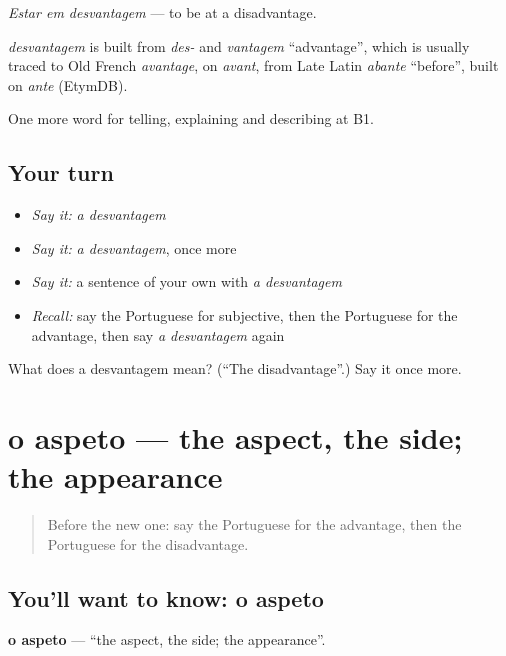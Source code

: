 \emph{Estar em desvantagem} — to be at a disadvantage.

\begin{cousinweb}
\emph{desvantagem} is built from \emph{des-} and \emph{vantagem} \textquotedblleft{}advantage\textquotedblright{}, which is usually traced to Old French \emph{avantage}, on \emph{avant}, from Late Latin \emph{abante} \textquotedblleft{}before\textquotedblright{}, built on \emph{ante} (EtymDB).
\end{cousinweb}

\begin{grammarlens}[title={What you've built}]
One more word for telling, explaining and describing at B1.
\end{grammarlens}

\subsection*{Your turn}
\begin{itemize}
\raggedright
  \item \emph{Say it:} \emph{a desvantagem}
  \item \emph{Say it:} \emph{a desvantagem}, once more
  \item \emph{Say it:} a sentence of your own with \emph{a desvantagem}
  \item \emph{Recall:} say the Portuguese for subjective, then the Portuguese for the advantage, then say \emph{a desvantagem} again
\end{itemize}

\begin{tcolorbox}[breakable,colback=teal!4,colframe=teal!35!black,title={Before you move on}]
What does a desvantagem mean? (\textquotedblleft{}The disadvantage\textquotedblright{}.) Say it once more.
\end{tcolorbox}
\section[o aspeto]{o aspeto — the aspect, the side; the appearance}

\label{lesson:PT-C345-aspeto}



\begin{quote}
Before the new one: say the Portuguese for the advantage, then the Portuguese for the disadvantage.
\end{quote}

\subsection*{You'll want to know: o aspeto}
\textbf{o aspeto} — \textquotedblleft{}the aspect, the side; the appearance\textquotedblright{}.

